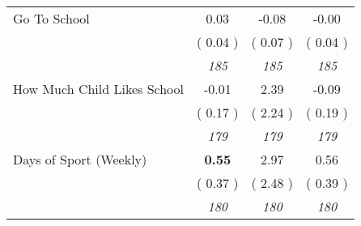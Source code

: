 \begin{tabular}{l c c c}
Go To School &      0.03 &     -0.08 &     -0.00 \\
& (     0.04 ) & (     0.07 ) & (     0.04 ) \\
& \textit{ 185 } & \textit{ 185 } & \textit{ 185 } \\
How Much Child Likes School &     -0.01 &      2.39 &     -0.09 \\
& (     0.17 ) & (     2.24 ) & (     0.19 ) \\
& \textit{ 179 } & \textit{ 179 } & \textit{ 179 } \\
Days of Sport (Weekly) & \textbf{      0.55 } &      2.97 &      0.56 \\
& (     0.37 ) & (     2.48 ) & (     0.39 ) \\
& \textit{ 180 } & \textit{ 180 } & \textit{ 180 } \\
\bottomrule
\end{tabular}
